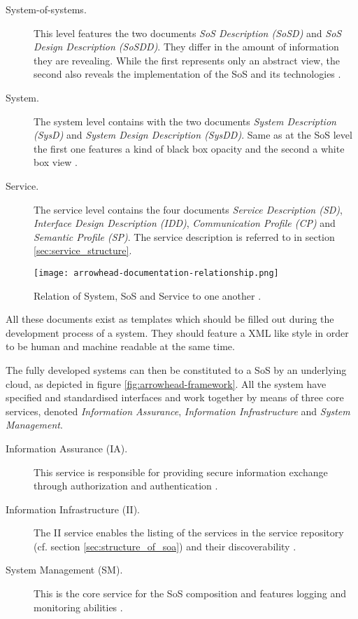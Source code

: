 \begin{description}
\item [System-of-systems.] This level features the two documents \emph{SoS Description (SoSD)} and \emph{SoS Design Description (SoSDD)}. They differ in the amount of information they are revealing. While the first represents only an abstract view, the second also reveals the implementation of the SoS and its technologies \cite{arrowhead_inpr}.
\item [System.] The system level contains with the two documents \emph{System Description (SysD)} and \emph{System Design Description (SysDD)}. Same as at the SoS level the first one features a kind of black box opacity and the second a white box view \cite{arrowhead_inpr}.
\item [Service.] The service level contains the four documents \emph{Service Description (SD)}, \emph{Interface Design Description (IDD)}, \emph{Communication Profile (CP)} and \emph{Semantic Profile (SP)}. The service description is referred to in section \ref{sec:service_structure}.
\end{description}

\begin{figure}[!htbp]
\centering
\texttt{[image: arrowhead-documentation-relationship.png]}
\caption{Relation of System, SoS and Service to one another \cite{arrowhead:presentation}.}
\label{fig:sys-arrowhead}
\end{figure}

All these documents exist as templates which should be filled out during the development process of a system. They should feature a XML like style in order to be human and machine readable at the same time.

The fully developed systems can then be constituted to a SoS by an underlying cloud, as depicted in figure \ref{fig:arrowhead-framework}. All the system have specified and standardised interfaces and work together by means of three core services, denoted \emph{Information Assurance}, \emph{Information Infrastructure} and \emph{System Management}.

\begin{description}
\item [Information Assurance (IA).]
This service is responsible for providing secure information exchange through authorization and authentication \cite{arrowhead:presentation}.
\item [Information Infrastructure (II).]
The II service enables the listing of the services in the service repository  (cf. section \ref{sec:structure_of_soa}) and their discoverability \cite{arrowhead:presentation}.
\item [System Management (SM).]
This is the core service for the SoS composition and features logging and monitoring abilities \cite{arrowhead:presentation}.
\end{description}

